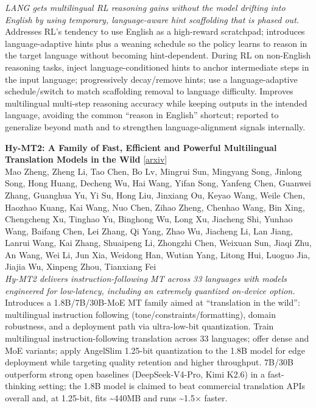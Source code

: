 \documentclass[12pt,letterpaper]{article}
\begin{document}
{\small\textit{LANG gets multilingual RL reasoning gains without the model drifting into English by using temporary, language-aware hint scaffolding that is phased out.}}\\[1pt]
{\footnotesize Addresses RL's tendency to use English as a high-reward scratchpad; introduces language-adaptive hints plus a weaning schedule so the policy learns to reason in the target language without becoming hint-dependent. During RL on non-English reasoning tasks, inject language-conditioned hints to anchor intermediate steps in the input language; progressively decay/remove hints; use a language-adaptive schedule/switch to match scaffolding removal to language difficulty. Improves multilingual multi-step reasoning accuracy while keeping outputs in the intended language, avoiding the common ``reason in English'' shortcut; reported to generalize beyond math and to strengthen language-alignment signals internally.}

\medskip

{\small\textbf{Hy-MT2: A Family of Fast, Efficient and Powerful Multilingual Translation Models in the Wild}} {\scriptsize[\href{https://arxiv.org/abs/2605.22064}{arxiv}]}\\
{\scriptsize Mao Zheng, Zheng Li, Tao Chen, Bo Lv, Mingrui Sun, Mingyang Song, Jinlong Song, Hong Huang, Decheng Wu, Hai Wang, Yifan Song, Yanfeng Chen, Guanwei Zhang, Guanghua Yu, Yi Su, Hong Liu, Jinxiang Ou, Keyao Wang, Weile Chen, Haozhao Kuang, Kai Wang, Nuo Chen, Zihao Zheng, Chenhao Wang, Bin Xing, Chengcheng Xu, Tinghao Yu, Binghong Wu, Long Xu, Jiacheng Shi, Yunhao Wang, Baifang Chen, Lei Zhang, Qi Yang, Zhao Wu, Jiacheng Li, Lan Jiang, Lanrui Wang, Kai Zhang, Shuaipeng Li, Zhongzhi Chen, Weixuan Sun, Jiaqi Zhu, An Wang, Wei Li, Jun Xia, Weidong Han, Wutian Yang, Litong Hui, Luoguo Jia, Jiajia Wu, Xinpeng Zhou, Tianxiang Fei}\\

{\small\textit{Hy-MT2 delivers instruction-following MT across 33 languages with models engineered for low-latency, including an extremely quantized on-device option.}}\\[1pt]
{\footnotesize Introduces a 1.8B/7B/30B-MoE MT family aimed at ``translation in the wild'': multilingual instruction following (tone/constraints/formatting), domain robustness, and a deployment path via ultra-low-bit quantization. Train multilingual instruction-following translation across 33 languages; offer dense and MoE variants; apply AngelSlim 1.25-bit quantization to the 1.8B model for edge deployment while targeting quality retention and higher throughput. 7B/30B outperform strong open baselines (DeepSeek-V4-Pro, Kimi K2.6) in a fast-thinking setting; the 1.8B model is claimed to beat commercial translation APIs overall and, at 1.25-bit, fits \textasciitilde{}440MB and runs \textasciitilde{}1.5× faster.}
\end{document}
